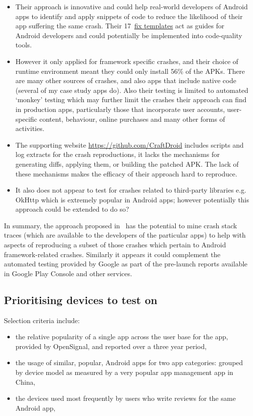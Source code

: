 \begin{itemize}
    \item Their approach is innovative and could help real-world developers of Android apps to identify and apply snippets of code to reduce the likelihood of their app suffering the same crash. Their 17~\href{https://github.com/CraftDroid/ExpData/tree/master/Fix_Templates}{fix templates} act as guides for Android developers and could potentially be implemented into code-quality tools.
    \item However it only applied for framework specific crashes, and their choice of runtime environment meant they could only install 56\% of the APKs. There are many other sources of crashes, and also apps that include native code (several of my case study apps do). Also their testing is limited to automated `monkey' testing which may further limit the crashes their approach can find in production apps, particularly those that incorporate user accounts, user-specific content, behaviour, online purchases and many other forms of activities.
    \item The supporting website \url{https://github.com/CraftDroid} includes scripts and log extracts for the crash reproductions, it lacks the mechanisms for generating diffs, applying them, or building the patched APK. The lack of these mechanisms makes the efficacy of their approach hard to reproduce.
    \item It also does not appear to test for crashes related to third-party libraries e.g. OkHttp which is extremely popular in Android apps; however potentially this approach could be extended to do so?
\end{itemize}

In summary, the approach proposed in~\citep{kong2019_mining_android_crash_fixes} has the potential to mine crash stack traces (which are available to the developers of the particular apps) to help with aspects of reproducing a subset of those crashes which pertain to Android framework-related crashes. Similarly it appears it could complement the automated testing provided by Google as part of the pre-launch reports available in Google Play Console and other services. 

\subsection{Prioritising devices to test on}

Selection criteria include:
\begin{itemize}
    \item the relative popularity of a single app across the user base for the app, provided by OpenSignal, and reported over a three year period,
    \item the usage of similar, popular, Android apps for two app categories: grouped by device model as measured by a very popular app management app in China,
    \item the devices used most frequently by users who write reviews for the same Android app,
\end{itemize}

